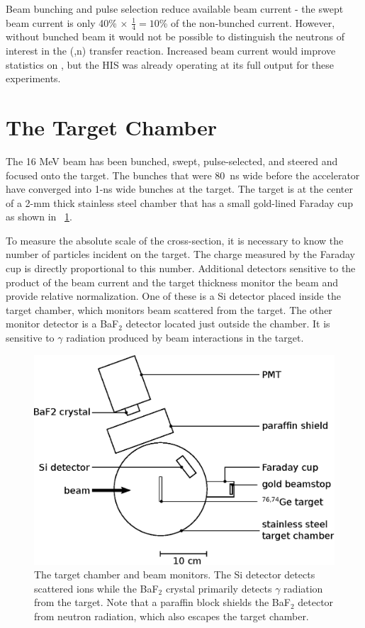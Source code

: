 Beam bunching and pulse selection reduce available beam current - the swept beam current is only 40\% $\times$ $\frac{1}{4} = 10$\% of the non-bunched current.  However, without bunched beam it would not be possible to distinguish the neutrons of interest in the (,n) transfer reaction.  Increased beam current would improve statistics on \reaction, but the HIS was already operating at its full output for these experiments.

\section{The Target Chamber}

The 16 MeV  beam has been bunched, swept, pulse-selected, and steered and focused onto the target.  The bunches that were 80~ns wide before the accelerator have converged into 1-ns wide bunches at the target.  The target is at the center of a 2-mm thick stainless steel chamber that has a small gold-lined Faraday cup as shown in {\fig}~\ref{fig:targetChamber}.

To measure the absolute scale of the cross-section, it is necessary to know the number of particles incident on the target.  The charge measured by the Faraday cup is directly proportional to this number.  Additional detectors sensitive to the product of the beam current and the target thickness monitor the beam and provide relative normalization.  One of these is a Si detector placed inside the target chamber, which monitors  beam scattered from the target.  The other monitor detector is a BaF$_2$ detector located just outside the chamber.  It is sensitive to $\gamma$ radiation produced by beam interactions in the target.  
\begin{figure}[htp]
\centering
\includegraphics[width=1.0\textwidth]{figures/targetChamber.eps}
\caption{The target chamber and beam monitors.  The Si detector detects scattered  ions while the BaF$_2$ crystal primarily detects $\gamma$ radiation from the target.  Note that a paraffin block shields the BaF$_2$ detector from neutron radiation, which also escapes the target chamber.}
\label{fig:targetChamber}
\end{figure}


